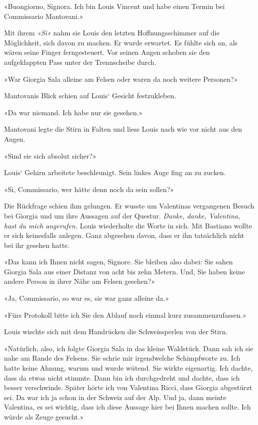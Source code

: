 «Buongiorno, Signora. Ich bin Louis Vincent und habe einen Termin bei
Commissario Mantovani.»

Mit ihrem \emph{«Si»} nahm sie Louis den letzten Hoffnungsschimmer auf
die Möglichkeit, sich davon zu machen. Er wurde erwartet. Es fühlte sich
an, als wären seine Finger ferngesteuert. Vor seinen Augen schoben sie
den aufgeklappten Pass unter der Trennscheibe durch.

«War Giorgia Sala alleine am Felsen oder waren da noch weitere
Personen?»

Mantovanis Blick schien auf Louis` Gesicht festzukleben.

«Da war niemand. Ich habe nur sie gesehen.»

Mantovani legte die Stirn in Falten und liess Louis nach wie vor nicht
aus den Augen.

«Sind sie sich absolut sicher?»

Louis` Gehirn arbeitete beschleunigt. Sein linkes Auge fing an zu
zucken.

«Si, Commissario, wer hätte denn noch da sein sollen?»

Die Rückfrage schien ihm gelungen. Er wusste um Valentinas vergangenen
Besuch bei Giorgia und um ihre Aussagen auf der Questur. \emph{Danke,
danke, Valentina, hast du mich angerufen.} Louis wiederholte die Worte
in sich. Mit Bastiano wollte er sich keinesfalls anlegen. Ganz abgesehen
davon, dass er ihn tatsächlich nicht bei ihr gesehen hatte.

«Das kann ich Ihnen nicht sagen, Signore. Sie bleiben also dabei: Sie
sahen Giorgia Sala aus einer Distanz von acht bis zehn Metern. Und, Sie
haben keine andere Person in ihrer Nähe am Felsen gesehen?»

«Ja, Commissario, so war es, sie war ganz alleine da.»

«Fürs Protokoll bitte ich Sie den Ablauf noch einmal kurz
zusammenzufassen.»

Louis wischte sich mit dem Handrücken die Schweissperlen von der Stirn.

«Natürlich, also, ich folgte Giorgia Sala in das kleine Waldstück. Dann
sah ich sie nahe am Rande des Felsens. Sie schrie mir irgendwelche
Schimpfworte zu. Ich hatte keine Ahnung, warum und wurde wütend. Sie
wirkte eigenartig. Ich dachte, dass da etwas nicht stimmte. Dann bin ich
durchgedreht und dachte, dass ich besser verschwinde. Später hörte ich
von Valentina Ricci, dass Giorgia abgestürzt sei. Da war ich ja schon in
der Schweiz auf der Alp. Und ja, dann meinte Valentina, es sei wichtig,
dass ich diese Aussage hier bei Ihnen machen sollte. Ich würde als Zeuge
gesucht.»

